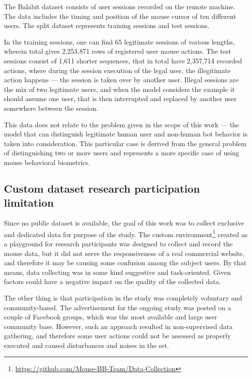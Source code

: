 The Balabit dataset consists of user sessions recorded on the remote machine.
The data includes the timing and position of the mouse cursor of ten different users.
The split dataset represents training sessions and test sessions.

In the training sessions, one can find 65 legitimate sessions of various lengths, wherein total gives 2,253,871 rows of registered user mouse actions.
The test sessions consist of 1,611 shorter sequences, that in total have 2,357,714 recorded actions, where during the session execution of the legal user, the illegitimate action happens --- the session is taken over by another user.
Illegal sessions are the mix of two legitimate users, and when the model considers the example it should assume one user, that is then interrupted and replaced by another user somewhere between the session.

This data does not relate to the problem given in the scope of this work --- the model that can distinguish legitimate human user and non-human bot behavior is taken into consideration.
This particular case is derived from the general problem of distinguishing two or more users and represents a more specific case of using mouse behavioral biometrics.

\subsection{Custom dataset research participation limitation}\label{subsec:custom-dataset-research}
Since no public dataset is available, the goal of this work was to collect exclusive and dedicated data for purpose of the study.
The custom environment\footnote{\url{https://github.com/Mouse-BB-Team/Data-Collection}} created as a playground for research participants was designed to collect and record the mouse data, but it did not serve the responsiveness of a real commercial website, and therefore it may be causing some confusion among the subject users.
By that means, data collecting was in some kind suggestive and task-oriented.
Given factors could have a negative impact on the quality of the collected data.

The other thing is that participation in the study was completely voluntary and community-based.
The advertisement for the ongoing study was posted on a couple of Facebook groups, which was the most available and large user community base.
However, such an approach resulted in non-supervised data gathering, and therefore some user actions could not be assessed as properly executed and caused disturbances and noises in the set.

